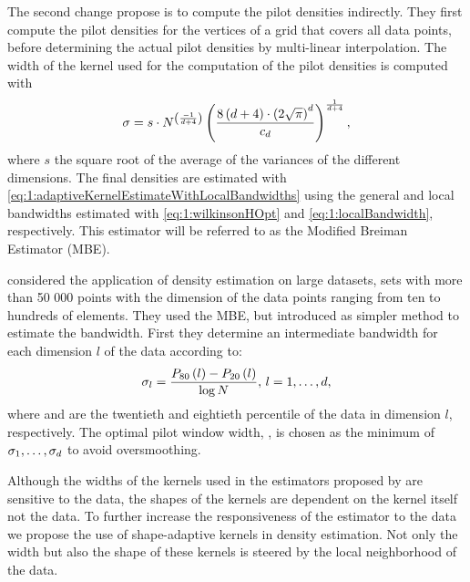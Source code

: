 	The second change \textcite{wilkinson1995dataplot} propose is to compute the pilot densities indirectly. They first compute the pilot densities for the vertices of a grid that covers all data points, before determining the actual pilot densities by multi-linear interpolation.
	The width of the kernel used for the computation of the pilot densities is computed with
		\begin{equation}\label{eq:1:wilkinsonHOpt}
			\sigma = 
			s \cdot N^{\left(\frac{-1}{d +  4}\right)}
			\left(\frac{8\left(d + 4\right) \cdot \left(2 \sqrt{\pi}\right)^d}{c_{d}}\right)^{\frac{1}{d + 4}},
		\end{equation}
	where $s$ the square root of the average of the variances of the different dimensions. The final densities are estimated with \cref{eq:1:adaptiveKernelEstimateWithLocalBandwidths} using the general and local bandwidths estimated with \cref{eq:1:wilkinsonHOpt} and \eqref{eq:1:localBandwidth}, respectively. This estimator will be referred to as the Modified Breiman Estimator (MBE). 

	\textcite{ferdosi2011comparison} considered the application of density estimation on large datasets, \ie sets with more than 50 000 points with the dimension of the data points ranging from ten to hundreds of elements. They used the MBE, but introduced as simpler method to estimate the bandwidth. First they determine an intermediate bandwidth for each dimension $l$ of the data according to:
		\begin{equation}\label{eq:1:ferdosiGeneralBandwidth}
			\sigma_l = \frac{P_{80}\left( l \right) - P_{20}\left( l \right)}{\log N}, \, l = 1, \dotsc, d,
		\end{equation}
	where  and  are the twentieth and eightieth percentile of the data in dimension $l$, respectively. 
	The optimal pilot window width, \varBandwidth, is chosen as the minimum of $\sigma_1, \dotsc, \sigma_d$ to avoid oversmoothing.

	Although the widths of the kernels used in the estimators proposed by \citeauthor{breiman1977variable,wilkinson1995dataplot} are sensitive to the data, the shapes of the kernels are dependent on the kernel itself not the data. To further increase the responsiveness of the estimator to the data we propose the use of shape-adaptive kernels in density estimation. Not only the width but also the shape of these kernels is steered by the local neighborhood of the data.

